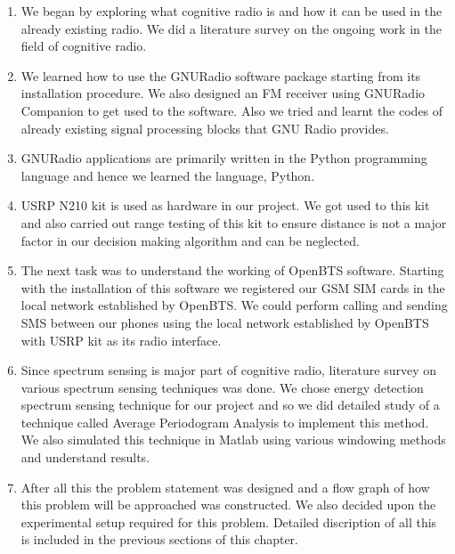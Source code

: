 \begin{enumerate}

\item We began by exploring what cognitive radio is and how it can be used 
in the already existing radio. We did a literature survey on the ongoing work in the
field of cognitive radio.

\item We learned how to use the GNURadio software package starting from its installation procedure. We 
also designed an FM receiver using GNURadio Companion to get used to the software. 
Also we tried and learnt the codes of already existing signal processing blocks 
that GNU Radio provides.

\item GNURadio applications are primarily written in the Python programming 
language and hence we learned the language, Python.

\item USRP N210 kit is used as hardware in our project. We got used to this kit and 
also carried out range testing of this kit to ensure distance is not a major factor in 
our decision making algorithm and can be neglected.
\item The next task was to understand the working of OpenBTS software. Starting 
with the installation of this software we registered our GSM SIM cards in the 
local network established by OpenBTS. We could perform calling and sending SMS
between our phones using the local network established by OpenBTS with USRP 
kit as its radio interface.
\item Since spectrum sensing is major part of cognitive radio, literature survey 
on various spectrum sensing techniques was done. We chose energy detection 
spectrum sensing technique for our project and so we did detailed study of a 
technique called Average Periodogram Analysis to implement this method. We also 
simulated this technique in Matlab using various windowing methods and 
understand results. 
\item After all this the problem statement was designed and a flow graph of 
how this problem will be approached was constructed. We also decided upon the experimental setup required for this problem. Detailed discription of all this is included in the previous sections of this chapter. 
 

\end{enumerate}
